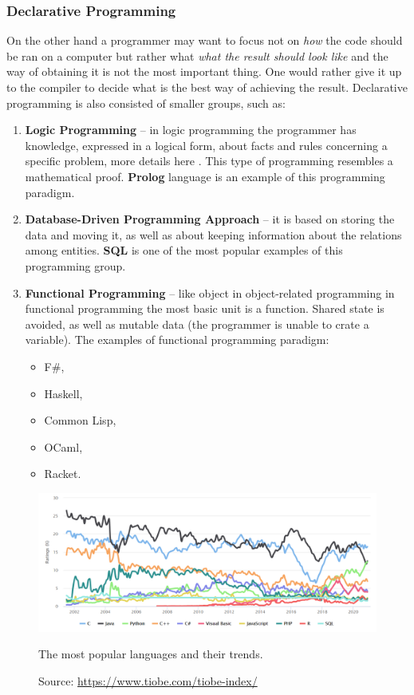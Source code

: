     \subsubsection{Declarative Programming}
        On the other hand a programmer may want to focus not on \textit{how} the code should be ran on a computer but rather what \textit{what the result should look like} and the way of obtaining it is not the most important thing. One would rather give it up to the compiler to decide what is the best way of achieving the result. Declarative programming is also consisted of smaller groups, such as:
        \begin{enumerate}
            \item \textbf{Logic Programming} -- in logic programming the programmer has knowledge, expressed in a logical form, about facts and rules concerning a specific problem, more details here \cite{logicProgramming}. This type of programming resembles a mathematical proof. \textbf{Prolog} language is an example of this programming paradigm.
            
            \item \textbf{Database-Driven Programming Approach} -- it is based on storing the data and moving it, as well as about keeping information about the relations among entities. \textbf{SQL} is one of the most popular examples of this programming group.
            
            \item \textbf{Functional Programming} -- like object in object-related programming in functional programming the most basic unit is a function. Shared state is avoided, as well as mutable data (the programmer is unable to crate a variable). The examples of functional programming paradigm:
                \begin{itemize}
                    \item F\#,
                    \item Haskell,
                    \item Common Lisp,
                    \item OCaml,
                    \item Racket.
                \end{itemize}
        \end{enumerate}
    
    \begin{figure}[H]
        \centering
        \includegraphics[width=\textwidth]{img/tiobe_index.png}
        \caption{The most popular languages and their trends.}
        \caption*{Source: \url{https://www.tiobe.com/tiobe-index/}}
        \label{fig:tioebeIndex}
    \end{figure}

